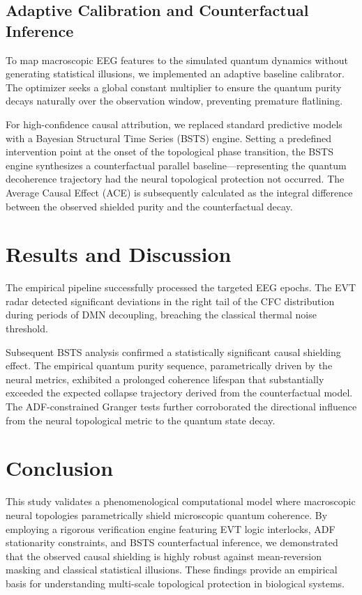 \documentclass[10pt,twocolumn,letterpaper]{article}
\begin{document}
\subsection{Adaptive Calibration and Counterfactual Inference}
To map macroscopic EEG features to the simulated quantum dynamics without generating statistical illusions, we implemented an adaptive baseline calibrator. The optimizer seeks a global constant multiplier to ensure the quantum purity decays naturally over the observation window, preventing premature flatlining.

For high-confidence causal attribution, we replaced standard predictive models with a Bayesian Structural Time Series (BSTS) engine. Setting a predefined intervention point at the onset of the topological phase transition, the BSTS engine synthesizes a counterfactual parallel baseline---representing the quantum decoherence trajectory had the neural topological protection not occurred. The Average Causal Effect (ACE) is subsequently calculated as the integral difference between the observed shielded purity and the counterfactual decay.

\section{Results and Discussion}
The empirical pipeline successfully processed the targeted EEG epochs. The EVT radar detected significant deviations in the right tail of the CFC distribution during periods of DMN decoupling, breaching the classical thermal noise threshold. 

Subsequent BSTS analysis confirmed a statistically significant causal shielding effect. The empirical quantum purity sequence, parametrically driven by the neural metrics, exhibited a prolonged coherence lifespan that substantially exceeded the expected collapse trajectory derived from the counterfactual model. The ADF-constrained Granger tests further corroborated the directional influence from the neural topological metric to the quantum state decay.

\section{Conclusion}
This study validates a phenomenological computational model where macroscopic neural topologies parametrically shield microscopic quantum coherence. By employing a rigorous verification engine featuring EVT logic interlocks, ADF stationarity constraints, and BSTS counterfactual inference, we demonstrated that the observed causal shielding is highly robust against mean-reversion masking and classical statistical illusions. These findings provide an empirical basis for understanding multi-scale topological protection in biological systems.
\end{document}
